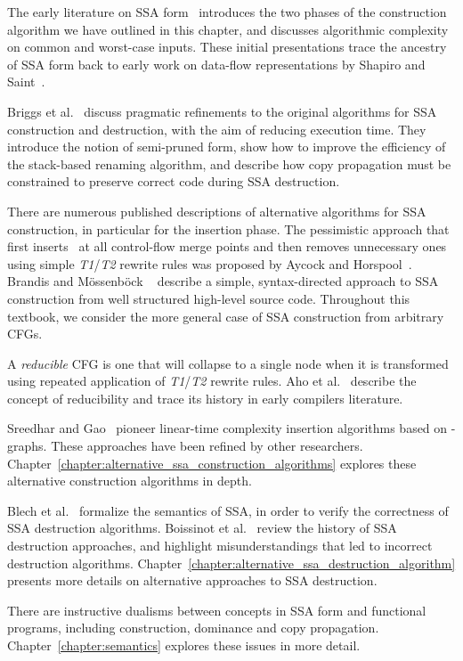 {The early literature on SSA form~\cite{cytron89efficient,cytron91efficiently} introduces the two phases of the construction algorithm we have outlined in this chapter, and discusses algorithmic complexity on common and worst-case inputs. 
These initial presentations trace the ancestry of SSA form back to early work on data-flow representations by Shapiro and Saint~\cite{shapiro69representation}.

Briggs et al.~\cite{briggs98practical} discuss pragmatic refinements to the original algorithms for SSA construction and destruction, with the aim of reducing execution time. 
They introduce the notion of semi-pruned form, show how to improve the efficiency of the stack-based renaming algorithm, and describe how copy propagation must be constrained to preserve correct code during SSA destruction.

There are numerous published descriptions of alternative algorithms for SSA construction, in particular for the \phifun insertion phase. 
The pessimistic approach that first inserts \phifuns\ at all control-flow merge points and then removes unnecessary ones using simple \emph{T1}/\emph{T2} rewrite rules was proposed by Aycock and Horspool~\cite{aycock00simple}. 
Brandis and M\"{o}ssenb\"{o}ck ~\cite{brandis94single} describe a simple, syntax-directed approach to SSA construction from well structured high-level source code. 
Throughout this textbook, we consider the more general case of SSA construction from arbitrary CFGs.

A \textit{reducible} CFG is one that will collapse to a single node when it is transformed using repeated application of \emph{T1}/\emph{T2} rewrite rules. 
Aho et al.~\cite{aho86compilers} describe the concept of reducibility and trace its history in early compilers literature.

Sreedhar and Gao~\cite{Sreedhar:1995:PoPL} pioneer linear-time complexity \phifun insertion algorithms based on \DJ-graphs. 
These approaches have been refined by other researchers. 
Chapter~\ref{chapter:alternative_ssa_construction_algorithms} explores these alternative construction algorithms in depth.


Blech et al.~\cite{blech05optimizing} formalize the semantics of SSA, in order to verify the correctness of SSA destruction algorithms. 
Boissinot et al.~\cite{boissinot09revisiting} review the history of SSA destruction approaches, and highlight misunderstandings that led to incorrect destruction algorithms. 
Chapter~\ref{chapter:alternative_ssa_destruction_algorithm} presents more details on alternative approaches to SSA destruction.

There are instructive dualisms between concepts in SSA form and functional programs, including construction, dominance and copy propagation. 
Chapter~\ref{chapter:semantics} explores these issues in more detail.


}

